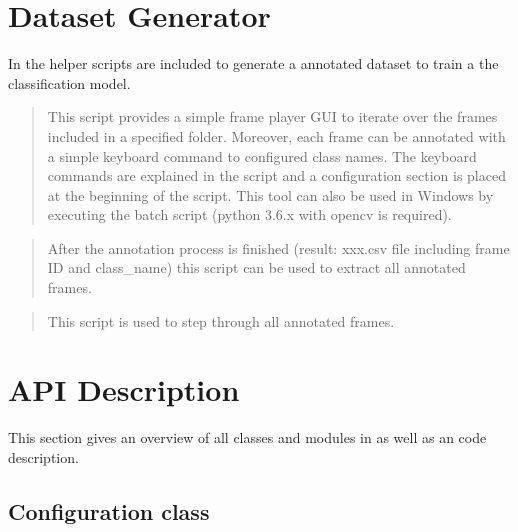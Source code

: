 \documentclass[letterpaper,10pt,english,openany,oneside]{sphinxmanual}
\begin{document}
\chapter{Dataset Generator}
\label{\detokenize{index:dataset-generator}}
In the  helper scripts are included to generate a annotated dataset to train
a the classification model.

\begin{quote}

This script provides a simple frame player GUI to iterate over the frames included in a specified folder. Moreover,
each frame can be annotated with a simple keyboard command to configured class names. The keyboard commands are
explained in the script and a configuration section is placed at the beginning of the script. This tool can also be
used in Windows by executing the batch script (python 3.6.x with opencv is required).
\end{quote}

\begin{quote}

After the annotation process is finished (result: xxx.csv file including frame ID and class\_name) this script can be
used to extract all annotated frames.
\end{quote}

\begin{quote}

This script is used to step through all annotated frames.
\end{quote}


\chapter{API Description}
\label{\detokenize{index:api-description}}
This section gives an overview of all classes and modules in  as well as an code description.


\section{Configuration class}
\label{\detokenize{Configuration:configuration-class}}\label{\detokenize{Configuration::doc}}
\end{document}
